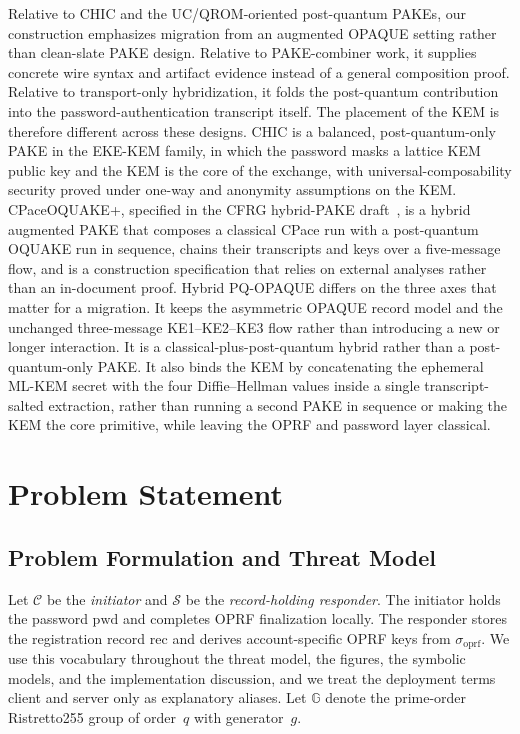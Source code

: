 \documentclass[preprint,12pt]{elsarticle}
\newcommand{\sigoprf}{\sigma_{\mathrm{oprf}}}
\theoremstyle{remark}
\begin{document}
Relative to CHIC and the UC/QROM-oriented post-quantum PAKEs, our
construction emphasizes migration from an augmented OPAQUE setting rather
than clean-slate PAKE design. Relative to PAKE-combiner work, it supplies
concrete wire syntax and artifact evidence instead of a general
composition proof. Relative to transport-only hybridization, it folds
the post-quantum contribution into the password-authentication
transcript itself.
The placement of the KEM is therefore different across these designs. CHIC is a
balanced, post-quantum-only PAKE in the EKE-KEM family, in which the password
masks a lattice KEM public key and the KEM is the core of the exchange, with
universal-composability security proved under one-way and anonymity assumptions
on the KEM. CPaceOQUAKE+, specified in the CFRG hybrid-PAKE draft~\cite{vos2025},
is a hybrid augmented PAKE that composes a classical CPace run with a
post-quantum OQUAKE run in sequence, chains their transcripts and keys over a
five-message flow, and is a construction specification that relies on external
analyses rather than an in-document proof. Hybrid PQ-OPAQUE differs on the three
axes that matter for a migration. It keeps the asymmetric OPAQUE record model
and the unchanged three-message KE1--KE2--KE3 flow rather than introducing a new
or longer interaction. It is a classical-plus-post-quantum hybrid rather than a
post-quantum-only PAKE. It also binds the KEM by concatenating the ephemeral
ML-KEM secret with the four Diffie--Hellman values inside a single
transcript-salted extraction, rather than running a second PAKE in sequence or
making the KEM the core primitive, while leaving the OPRF and password layer
classical.

\section{Problem Statement}

\subsection{Problem Formulation and Threat Model}

Let $\mathcal{C}$ be the \emph{initiator} and $\mathcal{S}$ be the
\emph{record-holding responder}. The initiator holds the password
$\mathrm{pwd}$ and completes OPRF finalization locally. The responder
stores the registration record $\mathrm{rec}$ and derives
account-specific OPRF keys from $\sigoprf$. We use this vocabulary
throughout the threat model, the figures, the symbolic models, and the
implementation discussion, and we treat the deployment terms client and
server only as explanatory aliases. Let $\mathbb{G}$ denote the
prime-order Ristretto255 group of order~$q$ with generator~$g$.
\end{document}
